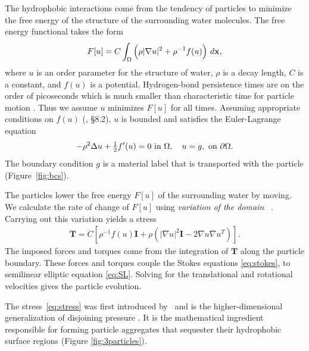The hydrophobic interactions come from the tendency of particles to
minimize the free energy of the structure of the surrounding water
molecules. The free energy functional takes the form 
\begin{equation}
\label{eq:free_energy}
  F[u] = C \int_{\Omega} \left(\rho |\nabla u|^2 + \rho^{-1} f(u)\right)
  \,d\mathbf{x},
\end{equation}
where $u$ is an order parameter for the structure of water, $\rho$ is a
decay length, $C$ is a constant, and $f(u)$ is a potential.
Hydrogen-bond persistence times are on the order of picoseconds
which is much smaller than characteristic time for 
particle motion \cite{MaGa13}.
Thus we assume $u$ minimizes $F[u]$ for all times.
Assuming appropriate conditions on $f(u)$ (\cite{evans10}, \S 8.2),
$u$ is bounded and satisfies the Euler-Lagrange equation
\begin{equation}
\label{eq:SL}
-\rho^2 \Delta u + \tfrac{1}{2}f'(u) = 0  \text{ in } \Omega,\quad u = g,
\text{ on } \partial\Omega.
\end{equation}
The boundary condition $g$ is a material label that is transported with
the particle (Figure~\ref{fig:bcs}).

The particles lower the free energy $F[u]$ of the surrounding water
by moving. We calculate the rate of change of $F[u]$ using
\emph{variation of the domain} ~\cite{Fu2018_SIAM,Bandle2015, Schiffer1954, Grinfeld2010}.
Carrying out
this variation yields a 
stress  
\begin{align}
  \label{eq:stress}
\mathbf{T}
= C \left[ \rho^{-1} f(u) \mathbf{I}
  + \rho \left(|\nabla u|^2 \mathbf{I} - 2\nabla u \nabla u^T\right)\right].
\end{align}
The imposed forces and torques come from the integration of $\mathbf{T}$
along the particle boundary.
These forces and torques couple the Stokes equations \eqref{eq:stokes},
to semilinear elliptic equation \eqref{eq:SL}.
Solving for the translational and rotational velocities gives the
particle evolution.



The stress~\eqref{eq:stress} was first
introduced by~\cite{Fu2018_SIAM} and is the higher-dimensional
generalization of disjoining pressure \cite{MaRa76, ErLjCl89, KoNa15,
Nagle17, KUZMIN2005}. It is the mathematical ingredient responsible for
forming particle aggregates that sequester their hydrophobic surface
regions (Figure \ref{fig:3particles}).

